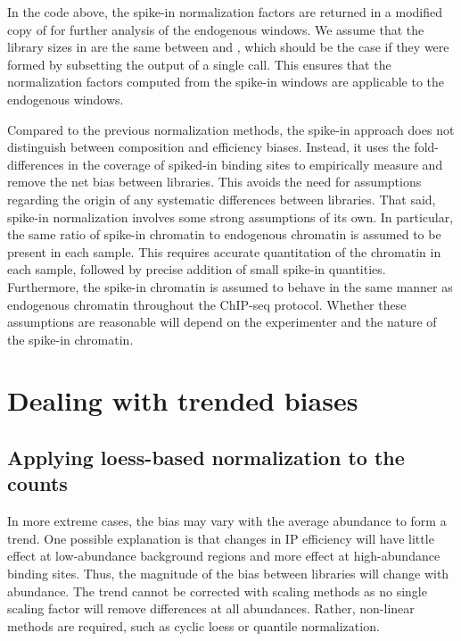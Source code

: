 \documentclass{report}\usepackage[]{graphicx}\usepackage[usenames,dvipsnames]{color}
\begin{document}
In the code above, the spike-in normalization factors are returned in a modified copy of  for further analysis of the endogenous windows.
We assume that the library sizes in  are the same between  and , 
which should be the case if they were formed by subsetting the output of a single  call.
This ensures that the normalization factors computed from the spike-in windows are applicable to the endogenous windows.

Compared to the previous normalization methods, the spike-in approach does not distinguish between composition and efficiency biases.
Instead, it uses the fold-differences in the coverage of spiked-in binding sites to empirically measure and remove the net bias between libraries.
This avoids the need for assumptions regarding the origin of any systematic differences between libraries.
That said, spike-in normalization involves some strong assumptions of its own.
In particular, the same ratio of spike-in chromatin to endogenous chromatin is assumed to be present in each sample.
This requires accurate quantitation of the chromatin in each sample, followed by precise addition of small spike-in quantities.
Furthermore, the spike-in chromatin is assumed to behave in the same manner as endogenous chromatin throughout the ChIP-seq protocol.
Whether these assumptions are reasonable will depend on the experimenter and the nature of the spike-in chromatin.

\section{Dealing with trended biases}

\subsection{Applying loess-based normalization to the counts}
In more extreme cases, the bias may vary with the average abundance to form a trend. 
One possible explanation is that changes in IP efficiency will have little effect at low-abundance background regions and more effect at high-abundance binding sites. 
Thus, the magnitude of the bias between libraries will change with abundance. 
The trend cannot be corrected with scaling methods as no single scaling factor will remove differences at all abundances.
Rather, non-linear methods are required, such as cyclic loess or quantile normalization.
\end{document}

